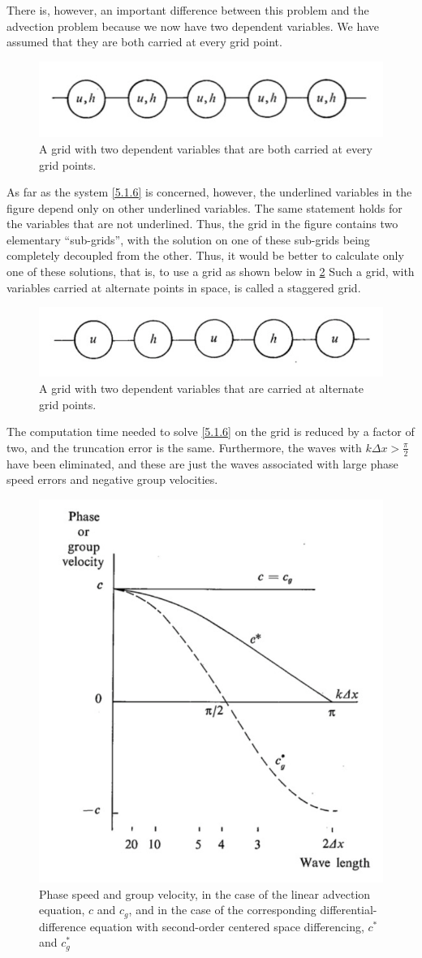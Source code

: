 There is, however, an important difference between this problem and the advection problem because we now have two dependent variables. We have assumed that they are both carried at every grid point.\begin{figure}[h]
    \centering
    \includegraphics[width=0.5\linewidth]{uploads/Screenshot 2024-11-13 180623.png}
    \caption{A grid with two dependent variables that are both carried at every grid points.}
    \label{fig:5.1.3}
\end{figure}
As far as the system \ref{5.1.6} is concerned, however, the underlined variables in the figure depend only on other underlined variables. The same statement holds for the variables that are not underlined. Thus, the grid in the figure contains two elementary “sub-grids”, with the solution on one of these sub-grids being completely decoupled from the other. Thus, it would be better to calculate only one of these solutions, that is, to use a grid as shown below in \ref{fig:5.1.4} Such a grid, with variables carried at alternate points in space, is called a staggered grid.
\begin{figure}[h]
    \centering
    \includegraphics[width=0.5\linewidth]{uploads/Screenshot 2024-11-13 180824.png}
    \caption{A grid with two dependent variables that are carried at alternate grid points.}
    \label{fig:5.1.4}
\end{figure}
The computation time needed to solve \ref{5.1.6} on the grid is reduced by a factor of two, and the truncation error is the same. Furthermore, the waves with $k\Delta x>\frac{\pi}{2}$ have been eliminated, and these are just the waves associated with large phase speed errors and negative group velocities. 
\begin{figure}[h!]
    \centering
    \includegraphics[width=0.45\linewidth]{uploads/Screenshot 2024-11-14 112837.png}
    \caption{Phase speed and group velocity, in the case of the linear advection equation, $c$ and $c_g$, and in the case of the corresponding differential-difference equation with second-order centered space differencing, $c^*$ and $c^*_g$}
    \label{fig:4.2.2}
\end{figure}


